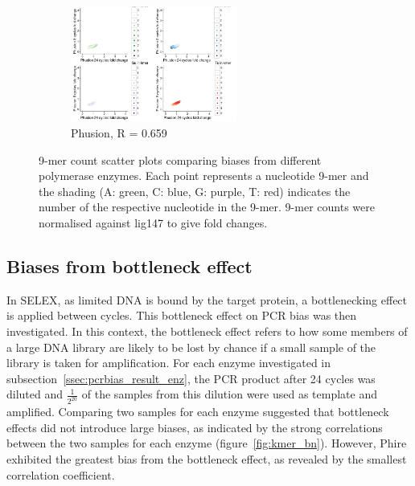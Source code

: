 \documentclass[parskip=full, numbers=noenddot]{scrbook}
\begin{document}
\begin{figure}[htbp]
\begin{subfigure}[htbp]{0.6\textwidth}
    \centering
    \includegraphics[width=0.6\textwidth]{kmer_phusion}
    \caption{Phusion, R = 0.659}
    \label{fig:kmer_enz_phusion}
  \end{subfigure}
  \caption{9-mer count scatter plots comparing biases from different polymerase enzymes.  Each point represents a nucleotide 9-mer and the shading (A: green, C: blue, G: purple, T: red) indicates the number of the respective nucleotide in the 9-mer.  9-mer counts were normalised against lig147 to give fold changes.}
  \label{fig:kmer_enz}
\end{figure}

\subsection{Biases from bottleneck effect}
\label{ssec:pcrbias_result_bn}

In SELEX, as limited DNA is bound by the target protein, a bottlenecking effect is applied between cycles.  This bottleneck effect on PCR bias was then investigated.  In this context, the bottleneck effect refers to how some members of a large DNA library are likely to be lost by chance if a small sample of the library is taken for amplification.  For each enzyme investigated in subsection~\ref{ssec:pcrbias_result_enz}, the PCR product after 24 cycles was diluted and $\frac{1}{2^{20}}$ of the samples from this dilution were used as template and amplified.  Comparing two samples for each enzyme suggested that bottleneck effects did not introduce large biases, as indicated by the strong correlations between the two samples for each enzyme (figure~\ref{fig:kmer_bn}).  However, Phire exhibited the greatest bias from the bottleneck effect, as revealed by the smallest correlation coefficient.
\end{document}
